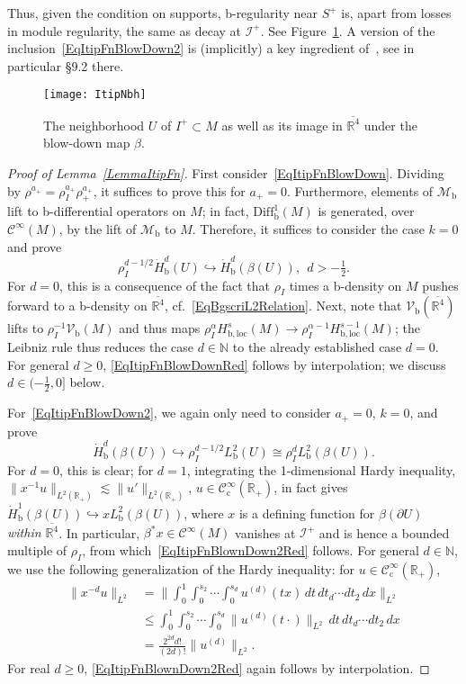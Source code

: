 \documentclass[reqno,11pt,letterpaper]{amsart}
\numberwithin{equation}{section}
\numberwithin{figure}{section}
\theoremstyle{definition}
\theoremstyle{remark}
\newcommand{\mc}{\mathcal}
\newcommand{\cC}{\mc C}
\newcommand{\cM}{\mc M}
\newcommand{\ms}{\mathscr}
\newcommand{\scri}{\ms I}
\newcommand{\N}{\mathbb{N}}
\newcommand{\R}{\mathbb{R}}
\newcommand{\hra}{\hookrightarrow}
\newcommand{\ol}{\overline}
\newcommand{\pa}{\partial}
\newcommand{\bop}{{\mathrm{b}}}
\newcommand{\cp}{{\mathrm{c}}}
\newcommand{\Diff}{\mathrm{Diff}}
\newcommand{\Vf}{\mathcal V}
\newcommand{\Vb}{\Vf_\bop}
\newcommand{\Diffb}{\Diff_\bop}
\newcommand{\half}{\tfrac{1}{2}}
\newcommand{\loc}{{\mathrm{loc}}}
\newcommand{\CI}{\cC^\infty}
\newcommand{\CIc}{\cC^\infty_\cp}
\newcommand{\Hbloc}{H_{\bop,\loc}}
\newcommand{\Hbsupp}{\dot H_{\bop}}
\newcommand{\usref}[1]{{\upshape\ref{#1}}}
\begin{document}
Thus, given the condition on supports, b-regularity near $S^+$ is, apart from losses in module regularity, the same as decay at $\scri^+$. See Figure~\ref{FigItipNbh}. A version of the inclusion~\eqref{EqItipFnBlowDown2} is (implicitly) a key ingredient of~\cite{BaskinVasyWunschRadMink2}, see in particular \S9.2 there.

\begin{figure}[!ht]
\texttt{[image: ItipNbh]}
\caption{The neighborhood $U$ of $I^+\subset M$ as well as its image in $\ol{\R^4}$ under the blow-down map $\beta$.}
\label{FigItipNbh}
\end{figure}

\begin{proof}[Proof of Lemma~\usref{LemmaItipFn}]
  First consider~\eqref{EqItipFnBlowDown}. Dividing by $\rho^{a_+}=\rho_I^{a_+}\rho_+^{a_+}$, it suffices to prove this for $a_+=0$. Furthermore, elements of $\cM_\bop$ lift to b-differential operators on $M$; in fact, $\Diffb^1(M)$ is generated, over $\CI(M)$, by the lift of $\cM_\bop$ to $M$. Therefore, it suffices to consider the case $k=0$ and prove
  \begin{equation}
  \label{EqItipFnBlowDownRed}
    \rho_I^{d-1/2} \Hbsupp^d(U) \hra \Hbsupp^d(\beta(U)),\ \ d>-\half.
  \end{equation}
  For $d=0$, this is a consequence of the fact that $\rho_I$ times a b-density on $M$ pushes forward to a b-density on $\ol{\R^4}$, cf.\ \eqref{EqBgscriL2Relation}. Next, note that $\Vb(\ol{\R^4})$ lifts to $\rho_I^{-1}\Vb(M)$ and thus maps $\rho_I^\alpha\Hbloc^s(M)\to\rho_I^{\alpha-1}\Hbloc^{s-1}(M)$; the Leibniz rule thus reduces the case $d\in\N$ to the already established case $d=0$. For general $d\geq 0$, \eqref{EqItipFnBlowDownRed} follows by interpolation; we discuss $d\in(-\half,0]$ below.

  For~\eqref{EqItipFnBlowDown2}, we again only need to consider $a_+=0$, $k=0$, and prove
  \begin{equation}
  \label{EqItipFnBlownDown2Red}
    \Hbsupp^d(\beta(U)) \hra \rho_I^{d-1/2}L^2_\bop(U) \cong \rho_I^d L^2_\bop(\beta(U)).
  \end{equation}
  For $d=0$, this is clear; for $d=1$, integrating the 1-dimensional Hardy inequality, $\|x^{-1}u\|_{L^2(\R_+)}\lesssim\|u'\|_{L^2(\R_+)}$, $u\in\CIc(\R_+)$, in fact gives $\Hbsupp^1(\beta(U))\hra x L^2_\bop(\beta(U))$, where $x$ is a defining function for $\beta(\pa U)$ \emph{within $\ol{\R^4}$}. In particular, $\beta^*x\in\CI(M)$ vanishes at $\scri^+$ and is hence a bounded multiple of $\rho_I$, from which~\eqref{EqItipFnBlownDown2Red} follows. For general $d\in\N$, we use the following generalization of the Hardy inequality: for $u\in\CIc(\R_+)$,
  \begin{align*}
    \|x^{-d}u\|_{L^2} &= \biggl\|\int_0^1\int_0^{s_2}\cdots\int_0^{s_d} u^{(d)}(t x)\,dt\,dt_d\cdots dt_2\,dx\biggr\|_{L^2} \\
      &\leq \int_0^1\int_0^{s_2}\cdots\int_0^{s_d} \|u^{(d)}(t\cdot)\|_{L^2}\,dt\,dt_d\cdots dt_2\,dx \\
      &= \frac{2^{2 d}d!}{(2 d)!} \|u^{(d)}\|_{L^2}.
  \end{align*}
  For real $d\geq 0$, \eqref{EqItipFnBlownDown2Red} again follows by interpolation.


\end{proof}
\end{document}
